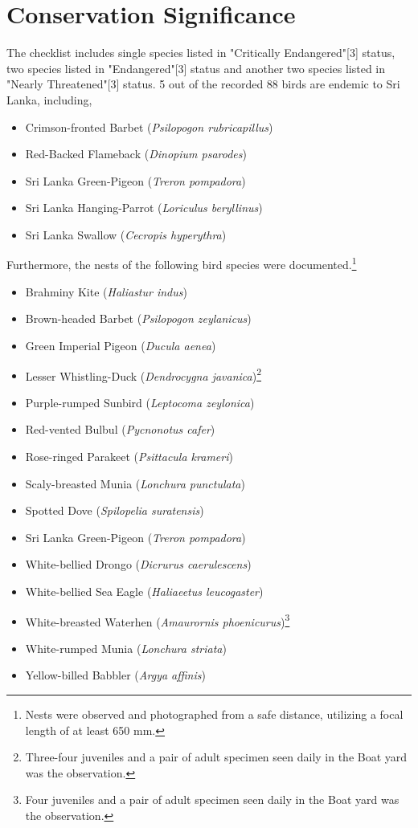 \section{Conservation Significance}
The checklist includes single species listed in "Critically Endangered"[3] status, two species listed in "Endangered"[3] status  and another two species listed in "Nearly Threatened"[3] status. 5 out of the recorded 88 birds are endemic to Sri Lanka, including,
\begin{itemize}
\item Crimson-fronted Barbet (\textit{Psilopogon rubricapillus})
\item Red{-}Backed Flameback (\textit{Dinopium psarodes})
\item Sri Lanka Green-Pigeon (\textit{Treron pompadora})
 \item Sri Lanka Hanging-Parrot (\textit{Loriculus beryllinus})
   \item Sri Lanka Swallow (\textit{Cecropis hyperythra})
\end{itemize}
Furthermore, the nests of the following bird species were documented.\footnote{Nests were observed and photographed from a safe distance, utilizing a focal length of at least 650 mm.}
\begin{itemize}
\item Brahminy Kite (\textit{Haliastur indus})
\item Brown-headed Barbet (\textit{Psilopogon zeylanicus})
\item Green Imperial Pigeon (\textit{Ducula aenea})
\item Lesser Whistling{-}Duck (\textit{Dendrocygna javanica})\footnote{Three-four juveniles and a pair of adult specimen seen daily in the Boat yard was the observation.}
\item Purple-rumped Sunbird (\textit{Leptocoma zeylonica})
\item Red-vented Bulbul (\textit{Pycnonotus cafer})
\item Rose-ringed Parakeet (\textit{Psittacula krameri})
\item Scaly-breasted Munia (\textit{Lonchura punctulata})
\item Spotted Dove (\textit{Spilopelia suratensis})
\item Sri Lanka Green-Pigeon (\textit{Treron pompadora})
\item White-bellied Drongo (\textit{Dicrurus caerulescens})
\item White-bellied Sea Eagle (\textit{Haliaeetus leucogaster})
\item White-breasted Waterhen (\textit{Amaurornis phoenicurus})\footnote{Four juveniles and a pair of adult specimen seen daily in the Boat yard was the observation.}
\item White-rumped Munia (\textit{Lonchura striata})
\item Yellow-billed Babbler (\textit{Argya affinis})
\end{itemize}
